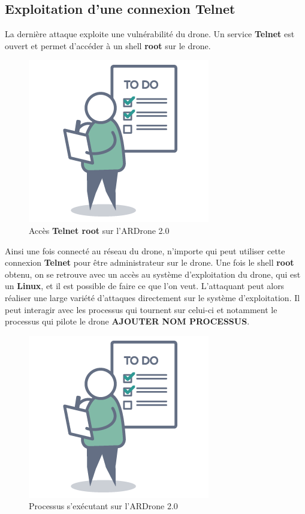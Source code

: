 \subsection{Exploitation d'une connexion Telnet}
La dernière attaque exploite une vulnérabilité du drone. Un service \textbf{Telnet} est ouvert et permet d'accéder à un shell \textbf{root} sur le drone.

\begin{figure}[H]
  \centering
  \includegraphics[scale=0.3]{images/todo.png}
  \caption{Accès \textbf{Telnet root} sur l'ARDrone 2.0}
\end{figure}

Ainsi une fois connecté au réseau du drone, n'importe qui peut utiliser cette connexion \textbf{Telnet} pour être administrateur sur le drone. Une fois le shell \textbf{root} obtenu, on se retrouve avec un accès au système d'exploitation du drone, qui est un \textbf{Linux}, et il est possible de faire ce que l'on veut. L'attaquant peut alors réaliser une large variété d'attaques directement sur le système d'exploitation. Il peut interagir avec les processus qui tournent sur celui-ci et notamment le processus qui pilote le drone \textbf{AJOUTER NOM PROCESSUS}.

\begin{figure}[H]
  \centering
  \includegraphics[scale=0.3]{images/todo.png}
  \caption{Processus s'exécutant sur l'ARDrone 2.0}
\end{figure}


